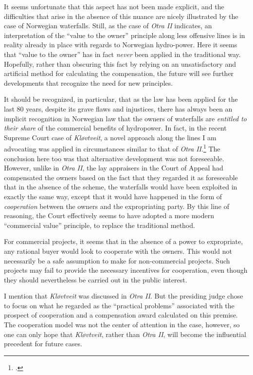 It seems unfortunate that this aspect has not been made explicit, and the difficulties that arise in the absence of this nuance are nicely illustrated by the case of Norwegian waterfalls. Still, as the case of \emph{Otra II} indicates, an interpretation of the ``value to the owner'' principle along less offensive lines is in reality already in place with regards to Norwegian hydro-power. Here it seems that ``value to the owner'' has in fact \emph{never} been applied in the traditional way. Hopefully, rather than obscuring this fact by relying on an unsatisfactory and artificial method for calculating the compensation, the future will see further developments that recognize the need for new principles. 

It should be recognized, in particular, that as the law has been applied for the last 80 years, despite its grave flaws and injustices, there has always been an implicit recognition in Norwegian law that the owners of waterfalls are \emph{entitled to their share} of the commercial benefits of hydropower. 
In fact, in the recent Supreme Court case of \emph{Kløvtveit}, a novel approach along the lines I am advocating was applied in circumstances similar to that of {\it Otra II}.\footcite{klovtveit11} The conclusion here too was that alternative development was not foreseeable. However, unlike in \emph{Otra II}, the lay appraisers in the Court of Appeal had compensated the owners based on the fact that they regarded it as foreseeable that in the absence of the scheme, the waterfalls would have been exploited in exactly the same way, except that it would have happened in the form of \emph{cooperation} between the owners and the expropriating party. By this line of reasoning, the Court effectively seems to have adopted a more modern ``commercial value'' principle, to replace the traditional method. 

For commercial projects, it seems that in the absence of a power to expropriate, any rational buyer would look to cooperate with the owners. This would not necessarily be a safe assumption to make for non-commercial projects. Such projects may fail to provide the necessary incentives for cooperation, even though they should nevertheless be carried out in the public interest.

I mention that \emph{Kløvtveit} was discussed in \emph{Otra II}. But the presiding judge chose to focus on what he regarded as the ``practical problems'' associated with the prospect of cooperation and a compensation award calculated on this premise. The cooperation model was not the center of attention in the case, however, so one can only hope that \emph{Kløvtveit}, rather than \emph{Otra II}, will become the influential precedent for future cases.

